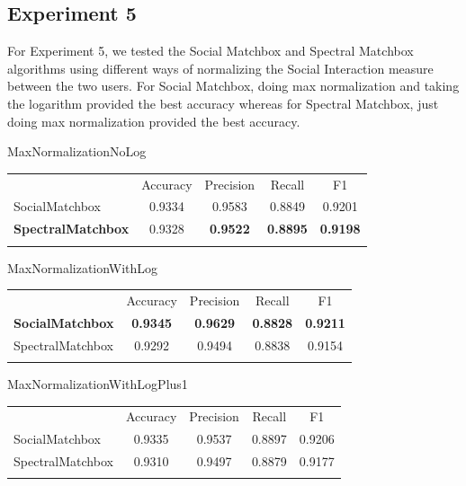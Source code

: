 \subsection{Experiment 5}
\label{sec:2}

For Experiment 5, we tested the Social Matchbox and Spectral Matchbox algorithms using different ways of normalizing the Social Interaction measure between the two users. For Social Matchbox, doing max normalization and taking the logarithm provided the best accuracy whereas for Spectral Matchbox, just doing max normalization provided the best accuracy.

MaxNormalizationNoLog
\begin{table}
\begin{tabular}{ l  c  c  c  c }
\hline\noalign{\smallskip}
 & Accuracy & Precision & Recall & F1 \\
 \noalign{\smallskip}\hline\noalign{\smallskip}
SocialMatchbox & 0.9334 & 0.9583 & 0.8849 & 0.9201 \\
{\bf SpectralMatchbox} & 0.9328 & {\bf 0.9522} & {\bf  0.8895} & {\bf 0.9198} \\
\noalign{\smallskip}\hline
\end{tabular} 
\end{table}

MaxNormalizationWithLog
\begin{table}
\begin{tabular}{ l  c  c  c  c }
\hline\noalign{\smallskip}
 & Accuracy & Precision & Recall & F1 \\
  \noalign{\smallskip}\hline\noalign{\smallskip}
{\bf SocialMatchbox} & {\bf 0.9345} & {\bf 0.9629} & {\bf 0.8828} & {\bf 0.9211} \\
SpectralMatchbox & 0.9292 & 0.9494 & 0.8838 & 0.9154 \\
\noalign{\smallskip}\hline
\end{tabular} 
\end{table}

MaxNormalizationWithLogPlus1
\begin{table}
\begin{tabular}{ l  c  c  c  c }
\hline\noalign{\smallskip}
 & Accuracy & Precision & Recall & F1 \\
 \noalign{\smallskip}\hline\noalign{\smallskip}
SocialMatchbox & 0.9335 & 0.9537 & 0.8897 & 0.9206 \\
SpectralMatchbox & 0.9310 & 0.9497 & 0.8879 &0.9177 \\
\noalign{\smallskip}\hline
\end{tabular} 
\end{table}

